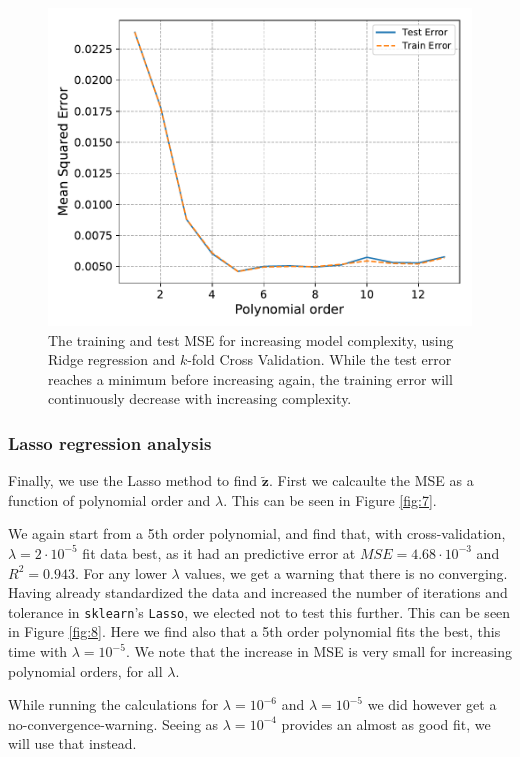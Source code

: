 \documentclass[a4paper,10pt,english]{article}
\def\code#1{\texttt{#1}} %
\begin{document}
\begin{figure}[H]
	\centering
	\includegraphics[scale=0.6]{d_Ridge_err_pdegree.pdf}
	\caption{The training and test MSE for increasing model complexity, using Ridge regression and $k$-fold Cross Validation. While the test error reaches a minimum before increasing again, the training error will continuously decrease with increasing complexity.}
	\label{fig:4}
\end{figure}


\subsubsection{Lasso regression analysis}
Finally, we use the Lasso method to find $\bm{{\tilde z}}$.
First we calcaulte the MSE as a function of polynomial order and $\lambda$. This can be seen in Figure \ref{fig:7}.

We again start from a 5th order polynomial, and find that, with cross-validation, $\lambda=2\cdot10^{-5}$ fit data best, as it had an predictive error at $MSE = 4.68\cdot 10^{-3}$ and $R^2=0.943$. For any lower $\lambda$ values, we get a warning that there is no converging. Having already standardized the data and increased the number of iterations and tolerance in \code{sklearn}'s \code{Lasso}, we elected not to test this further. This can be seen in Figure \ref{fig:8}. Here we find also that a 5th order polynomial fits the best, this time with $\lambda=10^{-5}$. We note that the increase in MSE is very small for increasing polynomial orders, for all $\lambda$. 

While running the calculations for $\lambda=10^{-6}$ and $\lambda=10^{-5}$ we did however get a no-convergence-warning.
Seeing as $\lambda=10^{-4}$ provides an almost as good fit, we will use that instead.
\end{document}
